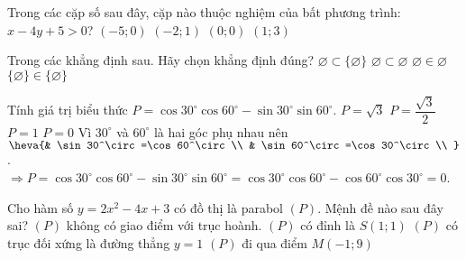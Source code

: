 \begin{ex}%
Trong các cặp số sau đây, cặp nào thuộc nghiệm của bất phương trình: $x-4y+5>0$?
\choice
{$(-5;0)$}
{$(-2;1)$}
{\True $(0;0)$}
{$(1;3)$}
\end{ex}

\begin{ex} %
Trong các khẳng định sau. Hãy chọn khẳng định đúng?
\choice
{$\varnothing \subset \{\varnothing \}$}
{\True $\varnothing \subset \varnothing$}
{$\varnothing \in \varnothing$}
{$\{\varnothing\}\in \{\varnothing \}$}
\loigiai{}
\end{ex}

\begin{ex}%
Tính giá trị biểu thức $P=\cos 30^\circ\cos 60^\circ-\sin 30^\circ\sin 60^\circ$.
\choice
{$P=\sqrt{3}$}
{$P=\dfrac{\sqrt{3}}{2}$}
{$P=1$}
{\True $P=0$}
\loigiai
{Vì $30^\circ$ và $60^\circ$ là hai góc phụ nhau nên $\heva{& \sin 30^\circ=\cos 60^\circ \\
& \sin 60^\circ=\cos 30^\circ \\
}$.\\
$\Rightarrow P=\cos 30^\circ\cos 60^\circ-\sin 30^\circ\sin 60^\circ=\cos 30^\circ\cos 60^\circ-\cos 60^\circ\cos 30^\circ=0$.}
\end{ex}

\begin{ex}%
Cho hàm số $y=2 x^2-4x+3$ có đồ thị là parabol $(P)$. Mệnh đề nào sau đây sai?
\choice
{$(P)$ không có giao điểm với trục hoành.}
{$(P)$ có đỉnh là $S(1 ; 1)$}
{$(P)$ có trục đối xứng là đường thẳng $y=1$}
{\True $(P)$ đi qua điểm $M(-1 ; 9)$}
\end{ex}

